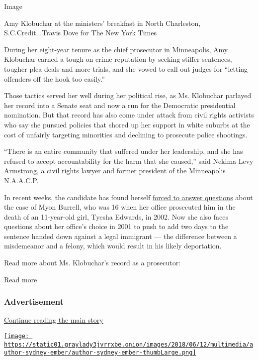 Image

Amy Klobuchar at the ministers' breakfast in North Charleston,
S.C.Credit...Travis Dove for The New York Times

During her eight-year tenure as the chief prosecutor in Minneapolis, Amy
Klobuchar earned a tough-on-crime reputation by seeking stiffer
sentences, tougher plea deals and more trials, and she vowed to call out
judges for ``letting offenders off the hook too easily.''

Those tactics served her well during her political rise, as Ms.
Klobuchar parlayed her record into a Senate seat and now a run for the
Democratic presidential nomination. But that record has also come under
attack from civil rights activists who say she pursued policies that
shored up her support in white suburbs at the cost of unfairly targeting
minorities and declining to prosecute police shootings.

``There is an entire community that suffered under her leadership, and
she has refused to accept accountability for the harm that she caused,''
said Nekima Levy Armstrong, a civil rights lawyer and former president
of the Minneapolis N.A.A.C.P.

In recent weeks, the candidate has found herself
\href{https://www.nytimes3xbfgragh.onion/2020/02/11/us/politics/amy-klobuchar-the-view.html}{forced
to answer questions} about the case of Myon Burrell, who was 16 when her
office prosecuted him in the death of an 11-year-old girl, Tyesha
Edwards, in 2002. Now she also faces questions about her office's choice
in 2001 to push to add two days to the sentence handed down against a
legal immigrant --- the difference between a misdemeanor and a felony,
which would result in his likely deportation.

Read more about Ms. Klobuchar's record as a prosecutor:

Read more

\hypertarget{advertisement-4}{%
\subsubsection{Advertisement}\label{advertisement-4}}

\protect\hyperlink{after-dfp-ad-mid5}{Continue reading the main story}

\href{https://www.nytimes3xbfgragh.onion/by/sydney-ember}{\texttt{[image: https://static01.graylady3jvrrxbe.onion/images/2018/06/12/multimedia/author-sydney-ember/author-sydney-ember-thumbLarge.png]}}

